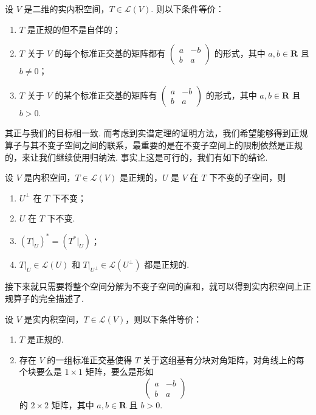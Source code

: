 \begin{theorem}
    设 $ V $ 是二维的实内积空间，$ T \in \mathcal{L}(V) $. 则以下条件等价：
    \begin{enumerate}
        \item $ T $ 是正规的但不是自伴的；

        \item $ T $ 关于 $ V $ 的每个标准正交基的矩阵都有 $ \begin{pmatrix} a & -b \\ b & a \end{pmatrix} $ 的形式，其中 $ a, b \in \mathbf{R} $ 且 $ b \neq 0 $；

        \item $ T $ 关于 $ V $ 的某个标准正交基的矩阵有 $ \begin{pmatrix} a & -b \\ b & a \end{pmatrix} $ 的形式，其中 $ a, b \in \mathbf{R} $ 且 $ b > 0 $.
    \end{enumerate}
\end{theorem}

其正与我们的目标相一致. 而考虑到实谱定理的证明方法，我们希望能够得到正规算子与其不变子空间之间的联系，最重要的是在不变子空间上的限制依然是正规的，来让我们继续使用归纳法. 事实上这是可行的，我们有如下的结论.

\begin{theorem}
    设 $ V $ 是内积空间，$ T \in \mathcal{L}(V) $ 是正规的，$ U $ 是 $ V $ 在 $ T $ 下不变的子空间，则
    \begin{enumerate}
        \item $ U^{\perp} $ 在 $ T $ 下不变；

        \item $ U $ 在 $ T $ 下不变.

        \item $ (T|_U)^* = (T^*|_U) $；

        \item $ T|_U \in \mathcal{L}(U) $ 和 $ T|_{U^{\perp }} \in \mathcal{L}(U^{\perp }) $ 都是正规的.
    \end{enumerate}
\end{theorem}

接下来就只需要将整个空间分解为不变子空间的直和，就可以得到实内积空间上正规算子的完全描述了.

\begin{theorem}
    设 $ V $ 是实内积空间，$ T \in \mathcal{L}(V) $，则以下条件等价：
    \begin{enumerate}
        \item $ T $ 是正规的.

        \item 存在 $ V $ 的一组标准正交基使得 $ T $ 关于这组基有分块对角矩阵，对角线上的每个块要么是 $ 1 \times 1 $ 矩阵，要么是形如
        \[
            \begin{pmatrix}
                a & -b \\
                b & a
            \end{pmatrix}
        \]
        的 $ 2 \times 2 $ 矩阵，其中 $ a, b \in \mathbf{R} $ 且 $ b > 0 $.
    \end{enumerate}
\end{theorem}



